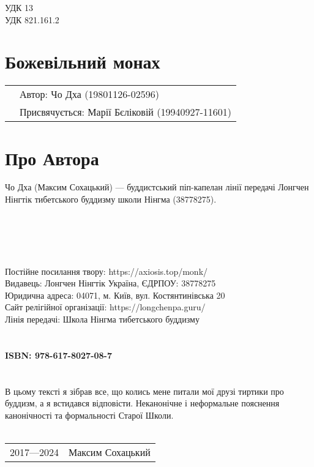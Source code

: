 \noindent УДК 13\\
\noindent УДК 821.161.2

\section*{Божевільний монах \dharmachakra}

\begin{tabular}{ll}
& Автор: Чо Дха (19801126-02596)\\
& Присвячується: Марії Бєліковій (19940927-11601)
\end{tabular}

\section*{Про Автора}
Чо Дха (Максим Сохацький) --- буддистський піп-капелан лінії передачі
Лонгчен Нінгтік тибетського буддизму школи Нінгма (38778275).
\\
\\
\\
\\
\\
\\
Постійне посилання твору: https://axiosis.top/monk/ \\
Видавець: Лонгчен Нінгтік Україна, ЄДРПОУ: 38778275 \\
Юридична адреса: 04071, м. Київ, вул. Костянтинівська 20 \\
Сайт релігійної організації: https://longchenpa.guru/ \\
Лінія передачі: Школа Нінгма тибетського буддизму \\
\\
\\
{\bf ISBN: 978-617-8027-08-7 \hspace{2em}} \\
\\
\\
\indent В цьому тексті я зібрав все, що колись мене
питали мої друзі тиртики про буддизм, а я встидався відповісти.
Неканонічне і неформальне пояснення канонічності та формальності Старої Школи.
\\
\\
\begin{tabular}{ll}
\textcopyright{} 2017---2024 & Максим Сохацький
\end{tabular}
